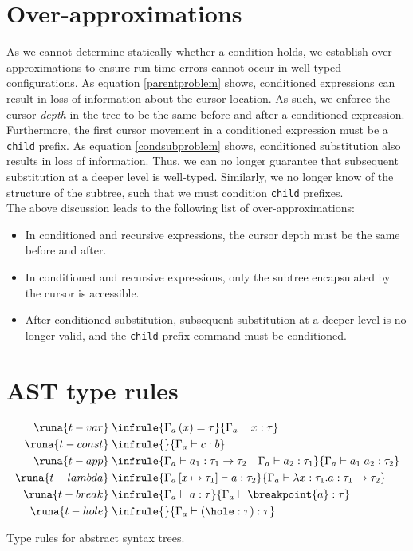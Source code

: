 \section{Over-approximations}
As we cannot determine statically whether a condition holds, we establish over-approximations to ensure run-time errors cannot occur in well-typed configurations. As equation \ref{parentproblem} shows, conditioned expressions can result in loss of information about the cursor location. As such, we enforce the cursor \textit{depth} in the tree to be the same before and after a conditioned expression. Furthermore, the first cursor movement in a conditioned expression must be a \texttt{child} prefix. As equation \ref{condsubproblem} shows, conditioned substitution also results in loss of information. Thus, we can no longer guarantee that subsequent substitution at a deeper level is well-typed. Similarly, we no longer know of the structure of the subtree, such that we must condition \texttt{child} prefixes.\\

The above discussion leads to the following list of over-approximations:
\begin{itemize}
    \item In conditioned and recursive expressions, the cursor depth must be the same before and after.
    \item In conditioned and recursive expressions, only the subtree encapsulated by the cursor is accessible.
    \item After conditioned substitution, subsequent substitution at a deeper level is no longer valid, and the \texttt{child} prefix command must be conditioned.
\end{itemize}
%
\section{AST type rules}
\begin{table*}[htp]
    \centering
    \begin{align*}
        \runa{t-var} &\; \infrule{\Gamma_a\left(x\right)=\tau}{\Gamma_a \vdash x : \tau}\\
        \runa{t-const} &\; \infrule{}{\Gamma_a \vdash c : b}\\
        \runa{t-app} &\; \infrule{\Gamma_a \vdash a_1 : \tau_1 \rightarrow \tau_2 \quad \Gamma_a \vdash a_2 : \tau_1}{\Gamma_a \vdash a_1\; a_2 : \tau_2}\\
        \runa{t-lambda} &\; \infrule{\Gamma_a\left[x \mapsto \tau_1\right] \vdash a : \tau_2}{\Gamma_a \vdash \lambda x:\tau_1.a : \tau_1 \rightarrow \tau_2} \\
        \runa{t-break} &\; \infrule{\Gamma_a \vdash a : \tau}{\Gamma_a \vdash \breakpoint{a} : \tau} \\
        \runa{t-hole} &\; \infrule{}{\Gamma_a \vdash \left(\hole : \tau\right) : \tau}
    \end{align*}
    \caption{Type rules for abstract syntax trees.}
    \label{tab:typerules}
\end{table*}

